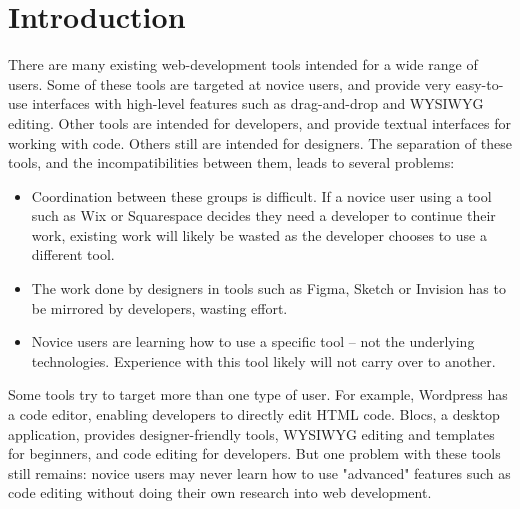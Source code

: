 \documentclass[conference, letterpaper]{IEEEtran}
\begin{document}
\section{Introduction}
There are many existing web-development tools intended for a wide range of users. Some of these tools are targeted at novice users, and provide very easy-to-use interfaces with high-level features such as drag-and-drop and WYSIWYG editing. Other tools are intended for developers, and provide textual interfaces for working with code. Others still are intended for designers. The separation of these tools, and the incompatibilities between them, leads to several problems:
\begin{itemize}
    \item Coordination between these groups is difficult. If a novice user using a tool such as Wix or Squarespace decides they need a developer to continue their work, existing work will likely be wasted as the developer chooses to use a different tool.
    \item The work done by designers in tools such as Figma, Sketch or Invision has to be mirrored by developers, wasting effort.
    \item Novice users are learning how to use a specific tool -- not the underlying technologies. Experience with this tool likely will not carry over to another.
\end{itemize}

Some tools try to target more than one type of user. For example, Wordpress has a code editor, enabling developers to directly edit HTML code. Blocs, a desktop application, provides designer-friendly tools, WYSIWYG editing and templates for beginners, and code editing for developers. But one problem with these tools still remains: novice users may never learn how to use "advanced" features such as code editing without doing their own research into web development.
\end{document}
